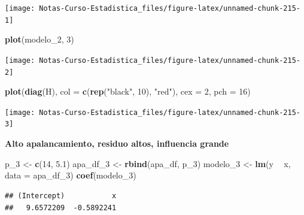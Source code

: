 \documentclass[
  12pt,
]{book}
\newenvironment{Shaded}{\begin{snugshade}}{\end{snugshade}}
\newcommand{\DataTypeTok}[1]{\textcolor[rgb]{0.13,0.29,0.53}{#1}}
\newcommand{\DecValTok}[1]{\textcolor[rgb]{0.00,0.00,0.81}{#1}}
\newcommand{\FloatTok}[1]{\textcolor[rgb]{0.00,0.00,0.81}{#1}}
\newcommand{\KeywordTok}[1]{\textcolor[rgb]{0.13,0.29,0.53}{\textbf{#1}}}
\newcommand{\NormalTok}[1]{#1}
\newcommand{\OperatorTok}[1]{\textcolor[rgb]{0.81,0.36,0.00}{\textbf{#1}}}
\newcommand{\StringTok}[1]{\textcolor[rgb]{0.31,0.60,0.02}{#1}}
\theoremstyle{definition}
\theoremstyle{definition}
\theoremstyle{definition}
\theoremstyle{remark}
\begin{document}
\begin{center}\texttt{[image: Notas-Curso-Estadistica\_files/figure-latex/unnamed-chunk-215-1]} \end{center}

\begin{Shaded}
\begin{Highlighting}[]
\KeywordTok{plot}\NormalTok{(modelo_}\DecValTok{2}\NormalTok{, }\DecValTok{3}\NormalTok{)}
\end{Highlighting}
\end{Shaded}

\begin{center}\texttt{[image: Notas-Curso-Estadistica\_files/figure-latex/unnamed-chunk-215-2]} \end{center}

\begin{Shaded}
\begin{Highlighting}[]
\KeywordTok{plot}\NormalTok{(}\KeywordTok{diag}\NormalTok{(H), }\DataTypeTok{col =} \KeywordTok{c}\NormalTok{(}\KeywordTok{rep}\NormalTok{(}\StringTok{"black"}\NormalTok{, }\DecValTok{10}\NormalTok{), }\StringTok{"red"}\NormalTok{), }\DataTypeTok{cex =} \DecValTok{2}\NormalTok{, }
    \DataTypeTok{pch =} \DecValTok{16}\NormalTok{)}
\end{Highlighting}
\end{Shaded}

\begin{center}\texttt{[image: Notas-Curso-Estadistica\_files/figure-latex/unnamed-chunk-215-3]} \end{center}

\textbf{Alto apalancamiento, residuo altos, influencia grande}

\begin{Shaded}
\begin{Highlighting}[]
\NormalTok{p_}\DecValTok{3}\NormalTok{ <-}\StringTok{ }\KeywordTok{c}\NormalTok{(}\DecValTok{14}\NormalTok{, }\FloatTok{5.1}\NormalTok{)}
\NormalTok{apa_df_}\DecValTok{3}\NormalTok{ <-}\StringTok{ }\KeywordTok{rbind}\NormalTok{(apa_df, p_}\DecValTok{3}\NormalTok{)}
\NormalTok{modelo_}\DecValTok{3}\NormalTok{ <-}\StringTok{ }\KeywordTok{lm}\NormalTok{(y }\OperatorTok{~}\StringTok{ }\NormalTok{x, }\DataTypeTok{data =}\NormalTok{ apa_df_}\DecValTok{3}\NormalTok{)}
\KeywordTok{coef}\NormalTok{(modelo_}\DecValTok{3}\NormalTok{)}
\end{Highlighting}
\end{Shaded}

\begin{verbatim}
## (Intercept)           x 
##   9.6572209  -0.5892241
\end{verbatim}
\end{document}
